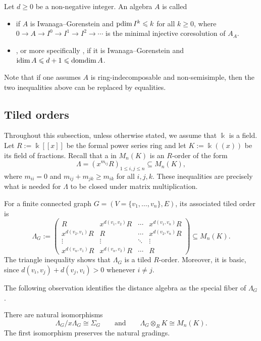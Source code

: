 \documentclass[a4paper,leqno]{amsart}
\begin{document}
Let $d\ge 0$ be a non-negative integer.
An algebra $A$ is called
\begin{itemize}
    \item {} if $A$ is Iwanaga--Gorenstein and $\operatorname{pdim} I^k\leqslant k$ for all $k\ge 0$, where $0\to A\to I^0 \to I^1 \to I^2\to \cdots$ is the minimal injective coresolution of $A_A$.

    \item {}, or more specifically , if it is Iwanaga--Gorenstein and $\operatorname{idim} A \leqslant d+1\leqslant \operatorname{domdim} A$.
\end{itemize}
Note that if one assumes $A$ is ring-indecomposable and non-semisimple, then the two inequalities above can be replaced by equalities.

\subsection{Tiled orders}\label{subsec:tiled-order}

Throughout this subsection, unless otherwise stated, we assume that $\Bbbk$ is a field.
Let $R:=\Bbbk[[x]]$ be the formal power series ring and let $K:=\Bbbk((x))$ be its field of fractions.  Recall that a
 in $M_n(K)$ is an $R$-order of the form
\[
\Lambda=(x^{m_{ij}}R)_{1\leq i,j\leq n}\subseteq M_n(K),
\]
where $m_{ii}=0$ and $m_{ij}+m_{jk}\geq m_{ik}$ for all $i,j,k$.  These inequalities are precisely what is needed for $\Lambda$ to be closed under matrix multiplication.

For a finite connected graph $G=(V=\{v_1,\ldots, v_n\},E)$, its associated tiled order is
\[
\Lambda_G
:=
\begin{pmatrix}
R & x^{d(v_1,v_2)}R & \cdots & x^{d(v_1,v_n)}R\\
x^{d(v_2,v_1)}R & R & \cdots & x^{d(v_2,v_n)}R\\
\vdots & \vdots & \ddots & \vdots\\
x^{d(v_n,v_1)}R & x^{d(v_n,v_2)}R & \cdots & R
\end{pmatrix}
\subseteq M_n(K).
\]
The triangle inequality shows that $\Lambda_G$ is a tiled $R$-order.
Moreover, it is basic, since $d(v_i,v_j)+d(v_j,v_i)>0$ whenever $i\neq j$.

The following observation identifies the distance algebra as the
special fiber of $\Lambda_G$.

\begin{prop}\label{prop:graph-metric-tiled-order}
There are natural isomorphisms
\[
\Lambda_G/x\Lambda_G\cong\Sigma_G
\qquad\text{and}\qquad
\Lambda_G\otimes_R K\cong M_n(K).
\]
The first isomorphism preserves the natural gradings.
\end{prop}
\end{document}

